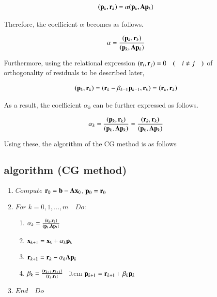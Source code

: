 \begin{eqnarray}
(\mathbf{p}_k,\mathbf{r}_k)=\alpha(\mathbf{p}_k,\mathbf{A}\mathbf{p}_k)
\end{eqnarray}


Therefore, the coefficient $\alpha$ becomes as follows.

\begin{eqnarray}
\alpha=\frac{(\mathbf{p}_k,\mathbf{r}_k)}{(\mathbf{p}_k,\mathbf{A}\mathbf{p}_k)}
\end{eqnarray}


Furthermore, using the relational expression $(\mathbf{r}_i,\mathbf{r}_j)=0 \quad (\quad  i\ne j\quad)$ of orthogonality of residuals to be described later,

\begin{eqnarray}
(\mathbf{p}_k,\mathbf{r}_k)=(\mathbf{r}_k-\beta_{k-1}\mathbf{p}_{k-1},\mathbf{r}_k)=(\mathbf{r}_k,\mathbf{r}_k)
\end{eqnarray}


As a result, the coefficient $\alpha_k$ can be further expressed as follows.

\begin{equation}
\alpha_k=\frac{(\mathbf{p}_k,\mathbf{r}_k)}{(\mathbf{p}_k,\mathbf{A}\mathbf{p}_k)}=\frac{(\mathbf{r}_k,\mathbf{r}_k)}{(\mathbf{p}_k,\mathbf{A}\mathbf{p}_k)}
\end{equation}



Using these, the algorithm of the CG method is as follows


\subsection{algorithm (CG method)}


\begin{enumerate}
\item $Compute$ $\mathbf{r}_0=\mathbf{b}-\mathbf{A}\mathbf{x}_0$, $\mathbf{p}_0=\mathbf{r}_0$
\item $For$ $k=0,1,\ldots,m\quad$$Do:$
\begin{enumerate}
\item $\alpha_k=\frac{(\mathbf{r}_k,\mathbf{r}_k)}{(\mathbf{p}_k,\mathbf{A}\mathbf{p}_k)}$
\item $\mathbf{x}_{k+1}=\mathbf{x}_k+\alpha_k\mathbf{p}_k$
\item $\mathbf{r}_{k+1}=\mathbf{r}_k-\alpha_k\mathbf{A}\mathbf{p}_k$
\item $\beta_k=\frac{(\mathbf{r}_{k+1},\mathbf{r}_{k+1})}{(\mathbf{r}_k,\mathbf{r}_k)}$
\ item $\mathbf{p}_{k+1}=\mathbf{r}_{k+1}+\beta_k\mathbf{p}_k$
\end{enumerate}
\item $End \quad Do$
\end{enumerate}


